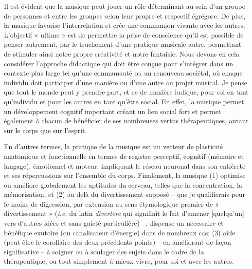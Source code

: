 \documentclass{article}
\begin{document}
\bigskip
Il est évident que la musique peut jouer un rôle déterminant au sein d'un groupe de personnes et entre les groupes selon leur propre et respectif égrégore. De plus, la musique favorise l'interrelation et crée une communion vivante avec les autres. L'objectif « ultime » est de permettre la prise de conscience qu'il est possible de penser autrement, par le truchement d'une pratique musicale autre, permettant de stimuler ainsi notre propre créativité et notre fantaisie. Nous devons en cela considérer l'approche didactique qui doit être conçue pour s'intégrer dans un contexte plus large tel qu'une communauté ou un renouveau  sociétal, où chaque individu doit participer d'une manière ou d'une autre au projet musical. Je pense que tout le monde peut y prendre part, et ce de manière ludique, pour soi en tant qu'individu et pour les autres en tant qu'être social. En effet, la musique permet un développement cognitif important créant un lien social fort et permet également à chacun de bénéficier de ses nombreuses vertus thérapeutiques, autant sur le corps que sur l'esprit. 

En d'autres termes, la pratique de la musique est un vecteur de plasticité anatomique et fonctionnelle en termes de registre perceptif, cognitif (mémoire et langage), émotionnel et moteur, impliquant le réseau neuronal dans son entièreté et ses répercussions sur l'ensemble du corps. Finalement, la musique (1) optimise ou améliore globalement les aptitudes du cerveau, telles que la concentration, la mémorisation, et (2) au delà du divertissement supposé -- que je qualifierais pour le moins de digression, par extension au sens étymologique premier de « divertissement » (\textit{i.e.} du latin \textit{divertere} qui signifiait le fait d'amener [quelqu'un] vers d'autres idées et sans gaieté particulière) --, dispense un nécessaire et bénéfique exutoire (ou canalisateur d'énergie) dans de nombreux cas; (3) aide (peut être le corollaire des deux précédents points) -- en améliorant de façon significative -- à soigner ou à soulager des sujets dans le cadre de la thérapeutique, ou tout simplement à mieux vivre, pour soi et avec les autres.

\bigskip
\end{document}
